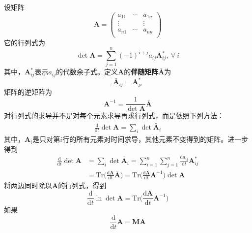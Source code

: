 \documentclass[12pt]{article}
\begin{document}
    设矩阵
    \begin{equation}
        \bm{A} = 
        \begin{pmatrix}
            a_{11} & \cdots & a_{1n}\\
            \vdots & & \vdots\\
            a_{n1} & \cdots & a_{nn}\\
            \end{pmatrix}
    \end{equation}
    它的行列式为
    \begin{equation}
        \det{\bm{A}} = \sum_{j=1}^n (-1)^{i+j} a_{ij} \bm{A}_{ij}^*, \ \forall \ i
    \end{equation}
    其中，$\bm{A}_{ij}^*$表示$a_{ij}$的代数余子式。定义$\bm{A}$的\textbf{伴随矩阵}$\bar{\bm{A}}$为
    \begin{equation}
        \bar{\bm{A}}_{ij} = \bm{A}_{ji}^* 
    \end{equation}
    矩阵的逆矩阵为
    \begin{equation}
        \bm{A}^{-1} = \frac 1{\det{\bm{A}}} \bm{\bar{A}}
    \end{equation}
    对行列式的求导并不是对每个元素求导再求行列式，而是依照下列方法：
    \begin{equation}\begin{aligned}
        \frac {\mathrm{d}}{\mathrm{d}t} \det{\bm{A}} = \sum_i \det{\tilde{\bm{A}_i}}
    \end{aligned}\end{equation}
    其中，$\bm{A}_i$是只对第$i$行的所有元素对时间求导，其他元素不变得到的矩阵。进一步得到
    \begin{equation}\begin{aligned}
        \frac {\mathrm{d}}{\mathrm{d}t} \det{\bm{A}} &= \sum_i \det{\tilde{\bm{A}_i}} = \sum_{i=1}^n \sum_{j=1}^n \frac {\mathrm{d}a_{ij}}{\mathrm{d}t} \bm{A}_{ij}^*\\
        &= \mathrm{Tr} \bigg(\frac {\mathrm{d}\bm{A}}{\mathrm{d}t} \bar{\bm{A}}\bigg) = \mathrm{Tr} \bigg(\frac {\mathrm{d}\bm{A}}{\mathrm{d}t} \bm{A}^{-1}\bigg) \det{\bm{A}}
    \end{aligned}\end{equation}
    将两边同时除以$\bm{A}$的行列式，得到
    \begin{equation}
        \frac {\mathrm{d}}{\mathrm{d}t} \ln{\det{\bm{A}}} = \mathrm{Tr} \bigg(\frac {\mathrm{d}\bm{A}}{\mathrm{d}t} \bm{A}^{-1}\bigg)
    \end{equation}
    如果
    \begin{equation}
        \frac {\mathrm{d}}{\mathrm{d}t} \bm{A} = \bm{MA}
    \end{equation}
\end{document}
